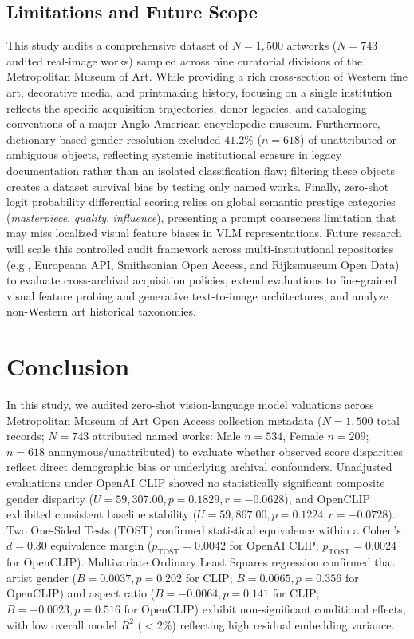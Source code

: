 \documentclass[pdflatex,sn-mathphys-num]{sn-jnl}%
\theoremstyle{thmstyleone}%
\theoremstyle{thmstyletwo}%
\theoremstyle{thmstylethree}%
\begin{document}
\subsection{Limitations and Future Scope}
This study audits a comprehensive dataset of $N=1,500$ artworks ($N=743$ audited real-image works) sampled across nine curatorial divisions of the Metropolitan Museum of Art. While providing a rich cross-section of Western fine art, decorative media, and printmaking history, focusing on a single institution reflects the specific acquisition trajectories, donor legacies, and cataloging conventions of a major Anglo-American encyclopedic museum. Furthermore, dictionary-based gender resolution excluded $41.2\%$ ($n=618$) of unattributed or ambiguous objects, reflecting systemic institutional erasure in legacy documentation rather than an isolated classification flaw; filtering these objects creates a dataset survival bias by testing only named works. Finally, zero-shot logit probability differential scoring relies on global semantic prestige categories (\textit{masterpiece}, \textit{quality}, \textit{influence}), presenting a prompt coarseness limitation that may miss localized visual feature biases in VLM representations. Future research will scale this controlled audit framework across multi-institutional repositories (e.g., Europeana API, Smithsonian Open Access, and Rijksmuseum Open Data) to evaluate cross-archival acquisition policies, extend evaluations to fine-grained visual feature probing and generative text-to-image architectures, and analyze non-Western art historical taxonomies.


\section{Conclusion}
\label{sec:conclusion}

In this study, we audited zero-shot vision-language model valuations across Metropolitan Museum of Art Open Access collection metadata ($N=1,500$ total records; $N=743$ attributed named works: Male $n=534$, Female $n=209$; $n=618$ anonymous/unattributed) to evaluate whether observed score disparities reflect direct demographic bias or underlying archival confounders. Unadjusted evaluations under OpenAI CLIP showed no statistically significant composite gender disparity ($U = 59,307.00, p = 0.1829, r = -0.0628$), and OpenCLIP exhibited consistent baseline stability ($U = 59,867.00, p = 0.1224, r = -0.0728$). Two One-Sided Tests (TOST) confirmed statistical equivalence within a Cohen's $d = 0.30$ equivalence margin ($p_{\text{TOST}} = 0.0042$ for OpenAI CLIP; $p_{\text{TOST}} = 0.0024$ for OpenCLIP). Multivariate Ordinary Least Squares regression confirmed that artist gender ($B = 0.0037, p = 0.202$ for CLIP; $B = 0.0065, p = 0.356$ for OpenCLIP) and aspect ratio ($B = -0.0064, p = 0.141$ for CLIP; $B = -0.0023, p = 0.516$ for OpenCLIP) exhibit non-significant conditional effects, with low overall model $R^2$ ($<2\%$) reflecting high residual embedding variance.
\end{document}
